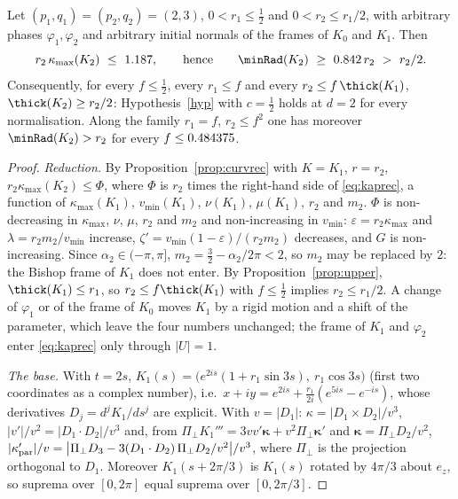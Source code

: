 \begin{proposition}[the case $d=2$]\label{prop:d2cert}
Let $(p_1,q_1)=(p_2,q_2)=(2,3)$, $0<r_1\le\frac12$ and $0<r_2\le r_1/2$, with arbitrary phases $\varphi_1,\varphi_2$ and arbitrary initial normals of the frames of $K_0$ and $K_1$. Then
\[
r_2\,\kappa_{\max}(K_2)\ \le\ \DtwoCertBound,\qquad\text{hence}\qquad \minRad(K_2)\ \ge\ \DtwoCertMinRad\,r_2\ >\ r_2/2 .
\]
Consequently, for every $f\le\frac12$, every $r_1\le f$ and every $r_2\le f\,\thick(K_1)$, $\thick(K_2)\ge r_2/2$: Hypothesis~\ref{hyp} with $c=\frac12$ holds at $d=2$ for every normalisation. Along the family $r_1=f$, $r_2\le f^2$ one has moreover $\minRad(K_2)>r_2$ for every $f\le0.484375$.
\end{proposition}
\begin{proof}
\emph{Reduction.} By Proposition~\ref{prop:curvrec} with $K=K_1$, $r=r_2$, $r_2\kappa_{\max}(K_2)\le\Phi$, where $\Phi$ is $r_2$ times the right-hand side of \eqref{eq:kaprec}, a function of $\kappa_{\max}(K_1)$, $v_{\min}(K_1)$, $\nu(K_1)$, $\mu(K_1)$, $r_2$ and $m_2$. $\Phi$ is non-decreasing in $\kappa_{\max}$, $\nu$, $\mu$, $r_2$ and $m_2$ and non-increasing in $v_{\min}$: $\varepsilon=r_2\kappa_{\max}$ and $\lambda=r_2m_2/v_{\min}$ increase, $\zeta'=v_{\min}(1-\varepsilon)/(r_2m_2)$ decreases, and $G$ is non-increasing. Since $\alpha_2\in(-\pi,\pi]$, $m_2=\frac32-\alpha_2/2\pi<2$, so $m_2$ may be replaced by $2$: the Bishop frame of $K_1$ does not enter. By Proposition~\ref{prop:upper}, $\thick(K_1)\le r_1$, so $r_2\le f\thick(K_1)$ with $f\le\frac12$ implies $r_2\le r_1/2$. A change of $\varphi_1$ or of the frame of $K_0$ moves $K_1$ by a rigid motion and a shift of the parameter, which leave the four numbers unchanged; the frame of $K_1$ and $\varphi_2$ enter \eqref{eq:kaprec} only through $|U|=1$.

\emph{The base.} With $t=2s$, $K_1(s)=\bigl(e^{2is}(1+r_1\sin3s),\ r_1\cos3s\bigr)$ (first two coordinates as a complex number), i.e.\ $x+iy=e^{2is}+\frac{r_1}{2i}(e^{5is}-e^{-is})$, whose derivatives $D_j=d^jK_1/ds^j$ are explicit. With $v=|D_1|$: $\kappa=|D_1\times D_2|/v^3$, $|v'|/v^2=|D_1\cdot D_2|/v^3$ and, from $\Pi_\perp K_1'''=3vv'\boldsymbol\kappa+v^2\Pi_\perp\boldsymbol\kappa'$ and $\boldsymbol\kappa=\Pi_\perp D_2/v^2$, $|\kappa_{\rm par}'|/v=\bigl|\Pi_\perp D_3-3(D_1\cdot D_2)\,\Pi_\perp D_2/v^2\bigr|/v^3$, where $\Pi_\perp$ is the projection orthogonal to $D_1$. Moreover $K_1(s+2\pi/3)$ is $K_1(s)$ rotated by $4\pi/3$ about $e_z$, so suprema over $[0,2\pi]$ equal suprema over $[0,2\pi/3]$.


\end{proof}
